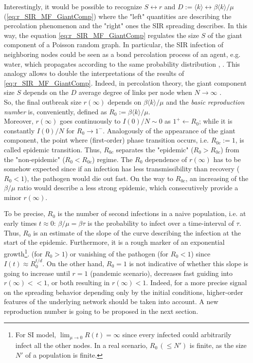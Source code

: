 \documentclass[a4paper,12pt,twoside]{book} %
\theoremstyle{definition}
\begin{document}
Interestingly, it would be possible to recognize $S \leftrightarrow r$ and $D:= \langle k \rangle \leftrightarrow \beta \langle k \rangle/\mu$ (\autoref{eq:r_SIR_MF_GiantComp}) where the "left" quantities are describing the percolation phenomenon and the "right" ones the SIR spreading describes. In this way, the equation \autoref{eq:r_SIR_MF_GiantComp} regulates the size $S$ of the giant component of a Poisson random graph. In particular, the SIR infection of neighboring nodes could be seen as a bond percolation process of an agent, e.g. water, which propagates according to the same probability distribution \cite{Newman:2010_Net:AnIntro}, \cite{barabasi::2016networkbook}. 
This analogy allows to double the interpretations of the results of \autoref{eq:r_SIR_MF_GiantComp}.
Indeed, in percolation theory, the giant component size $S$ depends on the $D$ average degree of links per node when $N \to \infty$ . 
\\So, the final outbreak size $r(\infty)$ depends on $\beta \langle k \rangle / \mu$ and the \textit{basic reproduction number} is, conveniently, defined as $R_0 := \beta \langle k \rangle / \mu$. 
\\Moreover, $r(\infty)$ goes continuously to $I(0)/N \sim 0$ as $1^{+} \leftarrow R_0$; while it is constantly $I(0)/N$ for $R_0 \to 1^{-}$. Analogously of the appearance of the giant component, the point where (first-order) phase transition occurs, i.e. $R_{0c} := 1$, is called epidemic transition. Thus, $R_{0c}$ separates the "epidemic" ($R_0 > R_{0c}$) from the "non-epidemic" ($R_0 < R_{0c}$) regime.
The $R_0$ dependence of $r(\infty)$ has to be somehow expected since if an infection has less transmissibility than recovery ($R_0 <1$), the pathogen would die out fast. On the way to $R_{0c}$, an increasing of the $\beta / \mu$ ratio would describe a less strong epidemic, which consecutively provide a minor $r(\infty)$.

To be precise, $R_0$ is the number of second infections in a naive population, i.e. at early times $t \approx 0$: $\beta/\mu = \beta \tau$ is the probability to infect over a time-interval of $\tau$. Thus, $R_0$ is an estimate of the slope of the curve describing the infection at the start of the epidemic. Furthermore, it is a rough marker of an exponential growth\footnote{For SI model, $\lim_{\mu \to 0} R(t) = \infty$ since every infected could arbitrarily infect all the other nodes. In a real scenario, $R_0 \, (\leq N')$ is finite, as the size $N'$ of a population is finite.}. (for $R_0 > 1$) or vanishing of the pathogen (for $R_0 < 1$) since $I(t) \approx R_0^{t/d}$. On the other hand, $R_0 =1$ is not indicative of whether this slope is going to increase until $r=1$ (pandemic scenario), decreases fast guiding into $r(\infty)<<1$, or both resulting in $r(\infty)<1$. Indeed, for a more precise signal on the spreading behavior depending only by the initial conditions, higher-order features of the underlying network should be taken into account. A new reproduction number is going to be proposed in the next section.
\end{document}
